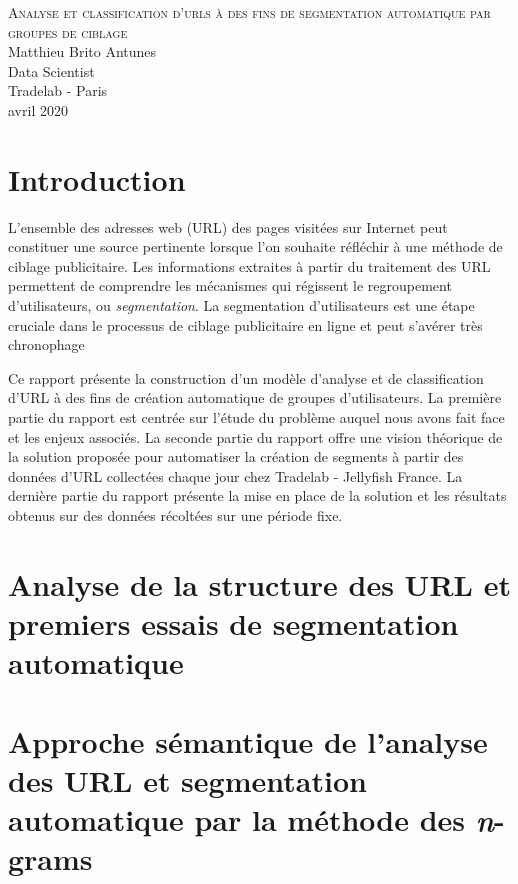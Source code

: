 \documentclass[11pt, a4paper]{article}
\begin{document}
	
\begin{titlepage}
\centering
\LARGE{\textsc{Analyse et classification d'urls à des fins de segmentation automatique par groupes de ciblage}}\\
\vfill
\large Matthieu Brito Antunes\\
\large Data Scientist\\
\large Tradelab - Paris\\
\large avril 2020\\
\end{titlepage}

\newpage
\tableofcontents
\listoftables
\listoffigures
\thispagestyle{empty}

\newpage
{}

\section{Introduction}
\label{sec:intro}

L'ensemble des adresses web (URL) des pages visitées sur Internet peut constituer une source pertinente lorsque l'on souhaite réfléchir à une méthode de ciblage publicitaire. Les informations extraites à partir du traitement des URL permettent de comprendre les mécanismes qui régissent le regroupement d'utilisateurs, ou \textit{segmentation}. La segmentation d'utilisateurs est une étape cruciale dans le processus de ciblage publicitaire en ligne et peut s'avérer très chronophage

Ce rapport présente la construction d'un modèle d'analyse et de classification d'URL à des fins de création automatique de groupes d'utilisateurs. La première partie du rapport est centrée sur l'étude du problème auquel nous avons fait face et les enjeux associés. La seconde partie du rapport offre une vision théorique de la solution proposée pour automatiser la création de segments à partir des données d'URL collectées chaque jour chez Tradelab - Jellyfish France. La dernière partie du rapport présente la mise en place de la solution et les résultats obtenus sur des données récoltées sur une période fixe.

\section{Analyse de la structure des URL et premiers essais de segmentation automatique}

\section{Approche sémantique de l'analyse des URL et segmentation automatique par la méthode des \textit{n}-grams}



\end{document}
